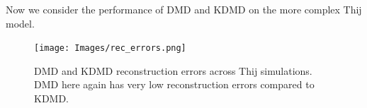 



\FloatBarrier

Now we consider the performance of DMD and KDMD on the more complex Thij model.


\begin{figure}
    \texttt{[image: Images/rec\_errors.png]}
    \centering
    \caption{DMD and KDMD reconstruction errors across Thij simulations. DMD here again
    has very low reconstruction errors compared to KDMD.}
\end{figure}

